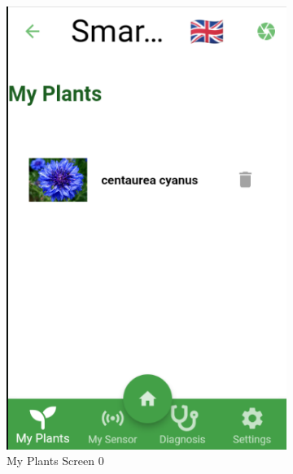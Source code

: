 \documentclass[a4paper,12pt]{report}
\begin{document}
\begin{figure}[H]	
	\begin{subfigure}{0.3\textwidth}
		\includegraphics[width=\textwidth]{./images/my_plants/my_plants_screen2.png}
		\caption{My Plants Screen 0}
		\label{fig:my_plants}
	\end{subfigure}
	\hfill
	\begin{subfigure}{0.3\textwidth}

\end{subfigure}
\end{figure}
\end{document}
